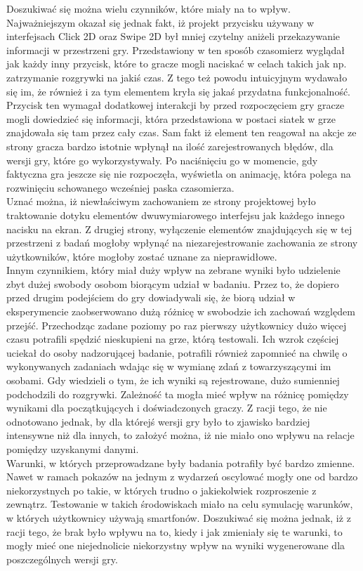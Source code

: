 \documentclass[a4paper,12pt,numbers=noenddot]{report}
\begin{document}
Doszukiwać się można wielu czynników, które miały na to wpływ. Najważniejszym okazał się jednak fakt, iż projekt przycisku używany w interfejsach Click 2D oraz Swipe 2D był mniej czytelny aniżeli przekazywanie informacji w przestrzeni gry. Przedstawiony w ten sposób czasomierz wyglądał jak każdy inny przycisk, które to gracze mogli naciskać w celach takich jak np. zatrzymanie rozgrywki na jakiś czas. Z tego też powodu intuicyjnym wydawało się im, że również i za tym elementem kryła się jakaś przydatna funkcjonalność.
Przycisk ten wymagał dodatkowej interakcji by przed rozpoczęciem gry gracze mogli dowiedzieć się informacji, która przedstawiona w postaci siatek w grze znajdowała się tam przez cały czas. Sam fakt iż element ten reagował na akcje ze strony gracza bardzo istotnie wpłynął na ilość zarejestrowanych błędów, dla wersji gry, które go wykorzystywały. Po naciśnięciu go w momencie, gdy faktyczna gra jeszcze się nie rozpoczęła, wyświetla on animację, która polega na rozwinięciu schowanego wcześniej paska czasomierza. \\
Uznać można, iż niewłaściwym zachowaniem ze strony projektowej było traktowanie dotyku elementów dwuwymiarowego interfejsu jak każdego innego nacisku na ekran. Z drugiej strony, wyłączenie elementów znajdujących się w tej przestrzeni z badań mogłoby wpłynąć na niezarejestrowanie zachowania ze strony użytkowników, które mogłoby zostać uznane za nieprawidłowe.\\
Innym czynnikiem, który miał duży wpływ na zebrane wyniki było udzielenie zbyt dużej swobody osobom biorącym udział w badaniu. Przez to, że dopiero przed drugim podejściem do gry dowiadywali się, że biorą udział w eksperymencie zaobserwowano dużą różnicę w swobodzie ich zachowań względem przejść. Przechodząc zadane poziomy po raz pierwszy użytkownicy dużo więcej czasu potrafili spędzić nieskupieni na grze, którą testowali. Ich wzrok częściej uciekał do osoby nadzorującej badanie, potrafili również zapomnieć na chwilę o wykonywanych zadaniach wdając się w wymianę zdań z towarzyszącymi im osobami. Gdy wiedzieli o tym, że ich wyniki są rejestrowane, dużo sumienniej podchodzili do rozgrywki. Zależność ta mogła mieć wpływ na różnicę pomiędzy wynikami dla początkujących i doświadczonych graczy. Z racji tego, że nie odnotowano jednak, by dla którejś wersji gry było to zjawisko bardziej intensywne niż dla innych, to założyć można, iż nie miało ono wpływu na relacje pomiędzy uzyskanymi danymi.\\
Warunki, w których przeprowadzane były badania potrafiły być bardzo zmienne. Nawet w ramach pokazów na jednym z wydarzeń oscylować mogły one od bardzo niekorzystnych po takie, w których trudno o jakiekolwiek rozproszenie z zewnątrz. Testowanie w takich środowiskach miało na celu symulację warunków, w których użytkownicy używają smartfonów. Doszukiwać się można jednak, iż z racji tego, że brak było wpływu na to, kiedy i jak zmieniały się te warunki, to mogły mieć one niejednolicie niekorzystny wpływ na wyniki wygenerowane dla poszczególnych wersji gry.\\
\end{document}
